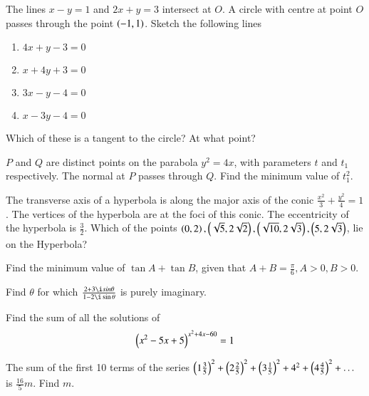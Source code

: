 \documentclass[journal,12pt,onecolumn]{IEEEtran}
\begin{document}
\solution

\begin{problem}
The lines $x-y=1$ and $2x+y=3$ intersect at $O$.  A circle with centre at point $O$ passes through the point $\left(-1,1\right)$. Sketch the following lines
\begin{enumerate}
\item $4x +y -3 = 0$
\item $x + 4y+3 = 0$
\item $3x - y  - 4 = 0$
\item $x - 3y - 4 = 0$
\end{enumerate}
Which of these is a tangent to the circle? At what point?
\end{problem}
\solution

\begin{problem}
$P$ and $Q$ are distinct points on the parabola $y^2 = 4x$, with parameters $t$ and $t_1$ respectively. The normal at $P$ passes through $Q$.  Find the minimum value of $t_1^2$.
\end{problem}
\solution

\begin{problem}
The transverse axis of a hyperbola is along the major axis of the conic $\frac{x^2}{3}+ \frac{y^2}{4} = 1$. The vertices of the hyperbola are at the foci of this conic. The eccentricity of the hyperbola is $\frac{3}{2}$. Which of the points $\left(0,2\right),\left(\sqrt{5},2\sqrt{2}\right),\left(\sqrt{10},2\sqrt{3}\right),\left(5, 2\sqrt{3}\right)$, lie on the Hyperbola?
\end{problem}
\begin{problem}
Find the minimum value of $\tan A + \tan B$, given that $ A+B = \frac{\pi}{6}, A>0,B>0$.
\end{problem}
%
\solution

\begin{problem}
Find $\theta$ for which $\frac{2+3\i sin \theta}{1 - 2\i \sin \theta}$ is purely imaginary.
\end{problem}
%
\solution

\begin{problem}
Find the sum of all the solutions of 
\begin{equation*}
\left(x^2-5x+5\right)^{x^2+4x-60}=1
\end{equation*}
\end{problem}
\solution

\begin{problem}
The sum of the first 10 terms of the series $\left(1\frac{3}{5}\right)^2+\left(2\frac{2}{5}\right)^2+\left(3\frac{1}{5}\right)^2+4^2+\left(4\frac{4}{5}\right)^2 + \dots $ is $\frac{16}{5}m$.  Find $m$.
\end{problem}
\end{document}
